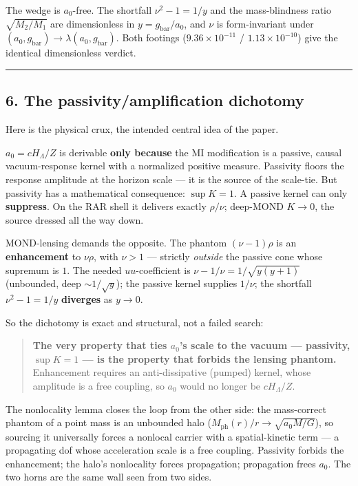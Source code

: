 \documentclass[
]{article}
\begin{document}
The wedge is \(a_0\)-free. The shortfall \(\nu^2-1=1/y\) and the
mass-blindness ratio \(\sqrt{M_2/M_1}\) are dimensionless in
\(y=g_\mathrm{bar}/a_0\), and \(\nu\) is form-invariant under
\((a_0,g_\mathrm{bar})\to\lambda(a_0,g_\mathrm{bar})\). Both footings
(\(9.36\times10^{-11}\) / \(1.13\times10^{-10}\)) give the identical
dimensionless verdict.

\begin{center}\rule{0.5\linewidth}{0.5pt}\end{center}

\subsection{6. The passivity/amplification
dichotomy}\label{the-passivityamplification-dichotomy}

Here is the physical crux, the intended central idea of the paper.

\(a_0=cH_\Lambda/Z\) is derivable \textbf{only because} the MI
modification is a passive, causal vacuum-response kernel with a
normalized positive measure. Passivity floors the response amplitude at
the horizon scale --- it is the source of the scale-tie. But passivity
has a mathematical consequence: \(\sup K = 1\). A passive kernel can
only \textbf{suppress}. On the RAR shell it delivers exactly
\(\rho/\nu\); deep-MOND \(K\to0\), the source dressed all the way down.

MOND-lensing demands the opposite. The phantom \((\nu-1)\rho\) is an
\textbf{enhancement} to \(\nu\rho\), with \(\nu>1\) --- strictly
\emph{outside} the passive cone whose supremum is \(1\). The needed
\(uu\)-coefficient is \(\nu-1/\nu=1/\sqrt{y(y+1)}\) (unbounded, deep
\(\sim1/\sqrt y\)); the passive kernel supplies \(1/\nu\); the shortfall
\(\nu^2-1=1/y\) \textbf{diverges} as \(y\to0\).

So the dichotomy is exact and structural, not a failed search:

\begin{quote}
\textbf{The very property that ties \(a_0\)'s scale to the vacuum ---
passivity, \(\sup K=1\) --- is the property that forbids the lensing
phantom.} Enhancement requires an anti-dissipative (pumped) kernel,
whose amplitude is a free coupling, so \(a_0\) would no longer be
\(cH_\Lambda/Z\).
\end{quote}

The nonlocality lemma closes the loop from the other side: the
mass-correct phantom of a point mass is an unbounded halo
(\(M_\mathrm{ph}(r)/r\to\sqrt{a_0M/G}\)), so sourcing it universally forces
a nonlocal carrier with a spatial-kinetic term --- a propagating dof
whose acceleration scale is a free coupling. Passivity forbids the
enhancement; the halo's nonlocality forces propagation; propagation
frees \(a_0\). The two horns are the same wall seen from two sides.
\end{document}

